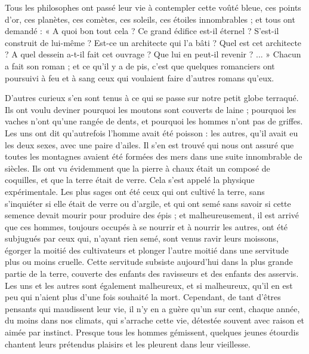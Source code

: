 \documentclass[a4paper, 11pt, oneside, landscape]{article}
\begin{document}
Tous les philosophes ont passé leur vie à contempler cette voûté bleue, ces points d'or, ces planètes, ces comètes, ces soleils, ces étoiles innombrables ; et tous ont demandé : « A quoi bon tout cela ? Ce grand édifice est-il éternel ? S'est-il construit de lui-même ? Est-ce un architecte qui l'a bâti ? Quel est cet architecte ? A quel dessein a-t-il fait cet ouvrage ? Que lui en peut-il revenir ? ... » Chacun a fait son roman ; et ce qu'il y a de pis, c'est que quelques romanciers ont poursuivi à feu et à sang ceux qui voulaient faire d'autres romans qu'eux.

D'autres curieux s'en sont tenus à ce qui se passe sur notre petit globe terraqué. Ils ont voulu deviner pourquoi les moutons sont couverts de laine ; pourquoi les vaches n'ont qu'une rangée de dents, et pourquoi les hommes n'ont pas de griffes. Les uns ont dit qu'autrefois l'homme avait été poisson : les autres, qu'il avait eu les deux sexes, avec une paire d'ailes. Il s'en est trouvé qui nous ont assuré que toutes les montagnes avaient été formées des mers dans une suite innombrable de siècles. Ils ont vu évidemment que la pierre à chaux était un composé de coquilles, et que la terre était de verre. Cela s'est appelé la physique expérimentale. Les plus sages ont été ceux qui ont cultivé la terre, sans s'inquiéter si elle était de verre ou d'argile, et qui ont semé sans savoir si cette semence devait mourir pour produire des épis ; et malheureusement, il est arrivé que ces hommes, toujours occupés à se nourrir et à nourrir les autres, ont été subjugués par ceux qui, n'ayant rien semé, sont venus ravir leurs moissons, égorger la moitié des cultivateurs et plonger l'autre moitié dans une servitude plus ou moins cruelle. Cette servitude subsiste aujourd'hui dans la plus grande partie de la terre, couverte des enfants des ravisseurs et des enfants des asservis. Les uns et les autres sont également malheureux, et si malheureux, qu'il en est peu qui n'aient plus d'une fois souhaité la mort. Cependant, de tant d'êtres pensants qui maudissent leur vie, il n'y en a guère qu'un sur cent, chaque année, du moins dans nos climats, qui s'arrache cette vie, détestée souvent avec raison et aimée par instinct. Presque tous les hommes gémissent, quelques jeunes étourdis chantent leurs prétendus plaisirs et les pleurent dans leur vieillesse.
\end{document}
